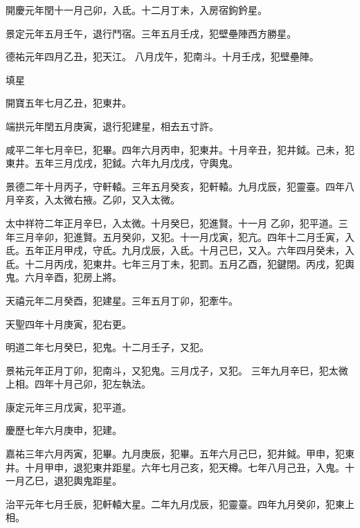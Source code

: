 \begin{pinyinscope}
 開慶元年閏十一月己卯，入氐。十二月丁未，入房宿鉤鈐星。



 景定元年五月壬午，退行鬥宿。三年五月壬戌，犯壁壘陣西方勝星。



 德祐元年四月乙丑，犯天江。
 八月戊午，犯南斗。十月壬戌，犯壁壘陣。



 填星



 開寶五年七月乙丑，犯東井。



 端拱元年閏五月庚寅，退行犯建星，相去五寸許。



 咸平二年七月辛巳，犯畢。四年六月丙申，犯東井。十月辛丑，犯井鉞。己未，犯東井。五年三月戊戌，犯鉞。六年九月戊戌，守輿鬼。



 景德二年十月丙子，守軒轅。三年五月癸亥，犯軒轅。九月戊辰，犯靈臺。四年八月辛亥，入太微右掖。乙卯，又入太微。



 太中祥符二年正月辛巳，入太微。十月癸巳，犯進賢。十一月
 乙卯，犯平道。三年三月辛卯，犯進賢。五月癸卯，又犯。十一月戊寅，犯亢。四年十二月壬寅，入氐。五年正月甲戌，守氐。九月戊辰，入氐。十月己巳，又入。六年四月癸未，入氐。十二月丙戌，犯東井。七年三月丁未，犯罰。五月乙酉，犯鍵閉。丙戌，犯輿鬼。六月辛酉，犯房上將。



 天禧元年二月癸酉，犯建星。三年五月丁卯，犯牽牛。



 天聖四年十月庚寅，犯右更。



 明道二年七月癸巳，犯鬼。十二月壬子，又犯。



 景祐元年正月丁卯，犯南斗，又犯鬼。三月戊子，又犯。
 三年九月辛巳，犯太微上相。四年十月己卯，犯左執法。



 康定元年三月戊寅，犯平道。



 慶歷七年六月庚申，犯建。



 嘉祐三年六月丙寅，犯畢。九月庚辰，犯畢。五年六月己巳，犯井鉞。甲申，犯東井。十月甲申，退犯東井距星。六年七月己亥，犯天樽。七年八月己丑，入鬼。十一月乙巳，退犯輿鬼距星。



 治平元年七月壬辰，犯軒轅大星。二年九月戊辰，犯靈臺。四年九月癸卯，犯東上相。




\end{pinyinscope}
